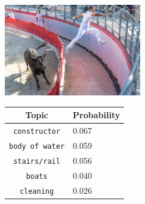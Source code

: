\documentclass[twoside,twocolumn]{article}
\begin{document}
	
	\begin{figure}
		\begin{subfigure}{\textwidth}
			\centering
			\begin{minipage}[t][4cm]{.5\linewidth}
				\centering
				\vspace{0pt}
				\includegraphics[height=4cm]{Images/7446693604.jpg}
			\end{minipage}\hfill
			\begin{minipage}[t]{.5\textwidth}
				\centering
				\vspace{0pt}
				\begin{tabular}{cl}
					Topic                           & Probability\\
					\hline
					\texttt{constructor}             & 0.067 \\
					\texttt{body of water}                   & 0.059 \\
					\texttt{stairs/rail}                 & 0.056 \\
					\texttt{boats}           & 0.040 \\
					\texttt{cleaning}        & 0.026\\
					\hline
				\end{tabular}
			\end{minipage}
		\end{subfigure}
		
		\vspace*{4mm}
		

\end{figure}
\end{document}
